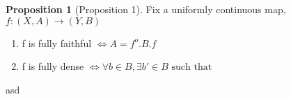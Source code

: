 \documentclass[18pt,a4paper]{article}
\theoremstyle{definition}
\newtheorem{proop}{Proposition}[section]
\begin{document}

\begin{proop}[Proposition 1]
	Fix a uniformly continuous map, $f:(X,A) \rightarrow (Y,B)$
	\begin{enumerate}[label=(\alph*)]
		\item f is fully faithful $\iff A=f^o.B.f$
		\item f is fully dense $\iff \forall b\in B, \exists b' \in B \text{ such that }  $
	\end{enumerate}
\end{proop}






\newpage
asd
\end{document}
